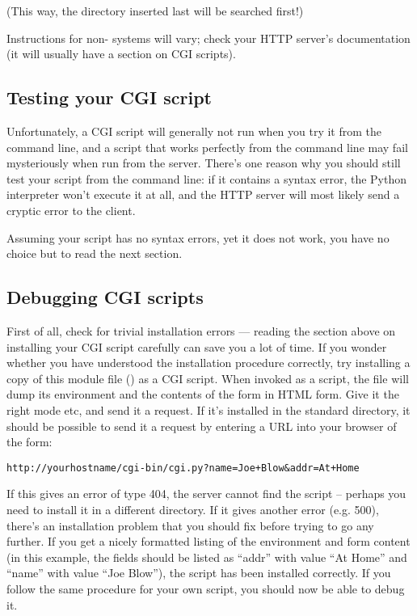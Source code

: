 (This way, the directory inserted last will be searched first!)

Instructions for non-\UNIX{} systems will vary; check your HTTP server's
documentation (it will usually have a section on CGI scripts).


\subsection{Testing your CGI script}

Unfortunately, a CGI script will generally not run when you try it
from the command line, and a script that works perfectly from the
command line may fail mysteriously when run from the server.  There's
one reason why you should still test your script from the command
line: if it contains a syntax error, the Python interpreter won't
execute it at all, and the HTTP server will most likely send a cryptic
error to the client.

Assuming your script has no syntax errors, yet it does not work, you
have no choice but to read the next section.


\subsection{Debugging CGI scripts}

First of all, check for trivial installation errors --- reading the
section above on installing your CGI script carefully can save you a
lot of time.  If you wonder whether you have understood the
installation procedure correctly, try installing a copy of this module
file () as a CGI script.  When invoked as a script, the file
will dump its environment and the contents of the form in HTML form.
Give it the right mode etc, and send it a request.  If it's installed
in the standard  directory, it should be possible to send it a
request by entering a URL into your browser of the form:

\begin{verbatim}
http://yourhostname/cgi-bin/cgi.py?name=Joe+Blow&addr=At+Home
\end{verbatim}

If this gives an error of type 404, the server cannot find the script
-- perhaps you need to install it in a different directory.  If it
gives another error (e.g.  500), there's an installation problem that
you should fix before trying to go any further.  If you get a nicely
formatted listing of the environment and form content (in this
example, the fields should be listed as ``addr'' with value ``At Home''
and ``name'' with value ``Joe Blow''), the  script has been
installed correctly.  If you follow the same procedure for your own
script, you should now be able to debug it.

